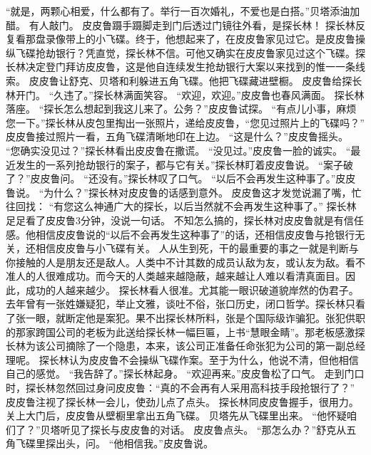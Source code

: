 \documentclass[a4paper,12pt,UTF8,twoside]{ctexbook}
\begin{document}
        “就是，两颗心相爱，什么都有了。举行一百次婚礼，不爱也是白搭。”贝塔添油加醋。 
        有人敲门。 
        皮皮鲁蹑手蹑脚走到门后透过门镜往外看，是探长林！ 
        探长林反复看那盘录像带上的小飞碟。终于，他想起来了，在皮皮鲁家见过它。是皮皮鲁操纵飞碟抢劫银行？凭直觉，探长林不信。可他又确实在皮皮鲁家见过这个飞碟。探长林决定登门拜访皮皮鲁，这是他自连续发生抢劫银行大案以来找到的惟一一条线索。 
        皮皮鲁让舒克、贝塔和利躲进五角飞碟。他把飞碟藏进壁橱。 
        皮皮鲁给探长林开门。 
        “久违了。”探长林满面笑容。 
        “欢迎，欢迎。”皮皮鲁也春风满面。 
        探长林落座。 
        “探长怎么想起到我这儿来了。公务？”皮皮鲁试探。 
        “有点儿小事，麻烦您一下。”探长林从皮包里掏出一张照片，递给皮皮鲁，“您见过照片上的飞碟吗？” 
        皮皮鲁接过照片一看，五角飞碟清晰地印在上边。 
        “这是什么？”皮皮鲁摇头。 
        “您确实没见过？”探长林看出皮皮鲁在撒谎。 
        “没见过。”皮皮鲁一脸的诚实。 
        “最近发生的一系列抢劫银行的案子，都与它有关。”探长林盯着皮皮鲁说。 
        “案子破了？”皮皮鲁问。 
        “还没有。”探长林叹了口气。 
        “以后不会再发生这种事了。”皮皮鲁说。 
        “为什么？”探长林对皮皮鲁的话感到意外。 
        皮皮鲁这才发觉说漏了嘴，忙往回找：  “有您这么神通广大的探长，以后当然就不会再发生这种事了。” 
        探长林足足看了皮皮鲁3分钟，没说一句话。 
        不知怎么搞的，探长林对皮皮鲁就是有信任感。他相信皮皮鲁说的“以后不会再发生这种事了”的话，还相信皮皮鲁与抢银行无关，还相信皮皮鲁与小飞碟有关。 
        人从生到死，干的最重要的事之一就是判断与你接触的人是朋友还是敌人。人类中不计其数的成员认敌为友，或认友为敌。看不准人的人很难成功。而今天的人类越来越隐蔽，越来越让人难以看清真面目。因此，成功的人越来越少。 
        探长林看人很准。尤其能一眼识破道貌岸然的伪君子。去年曾有一张姓嫌疑犯，举止文雅，谈吐不俗，张口历史，闭口哲学。探长林只看了张一眼，就断定他是案犯。果不出探长林所料，张是个国际级诈骗犯。张犯供职的那家跨国公司的老板为此送给探长林一幅巨匾，上书“慧眼金睛”。那老板感激探长林为该公司摘除了一个隐患，本来，该公司正准备任命张犯为公司的第一副总经理呢。 
        探长林认为皮皮鲁不会操纵飞碟作案。至于为什么，他说不清，但他相信自己的感觉。 
        “我告辞了。”探长林起身。 
        “欢迎再来。”皮皮鲁松了口气。 
        走到门口时，探长林忽然回过身问皮皮鲁：“真的不会再有人采用高科技手段抢银行了？” 
        皮皮鲁注视了探长林一会儿，使劲儿点了点头。 
        探长林同皮皮鲁握手，很用力。 
        关上大门后，皮皮鲁从壁橱里拿出五角飞碟。 
        贝塔先从飞碟里出来。 
        “他怀疑咱们了？”贝塔听见了探长与皮皮鲁的对话。 
        皮皮鲁点头。 
        “那怎么办？”舒克从五角飞碟里探出头，问。 
        “他相信我。”皮皮鲁说。 
\end{document}
